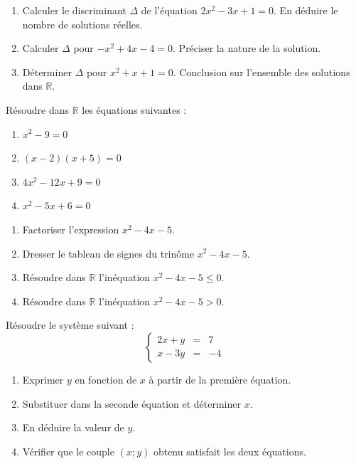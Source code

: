 \documentclass[11pt]{article}
\begin{document}
\begin{exercice}
\begin{enumerate}
    \item Calculer le discriminant $\Delta$ de l'équation $2x^2 - 3x + 1 = 0$. En déduire le nombre de solutions réelles.
    \item Calculer $\Delta$ pour $-x^2 + 4x - 4 = 0$. Préciser la nature de la solution.
    \item Déterminer $\Delta$ pour $x^2 + x + 1 = 0$. Conclusion sur l'ensemble des solutions dans $\mathbb{R}$.
\end{enumerate}
\end{exercice}

\begin{exercice}
Résoudre dans $\mathbb{R}$ les équations suivantes :
\begin{enumerate}
    \item $x^2 - 9 = 0$
    \item $(x-2)(x+5) = 0$
    \item $4x^2 - 12x + 9 = 0$
    \item $x^2 - 5x + 6 = 0$
\end{enumerate}
\end{exercice}

\begin{exercice}
\begin{enumerate}
    \item Factoriser l'expression $x^2 - 4x - 5$.
    \item Dresser le tableau de signes du trinôme $x^2 - 4x - 5$.
    \item Résoudre dans $\mathbb{R}$ l'inéquation $x^2 - 4x - 5 \leq 0$.
    \item Résoudre dans $\mathbb{R}$ l'inéquation $x^2 - 4x - 5 > 0$.
\end{enumerate}
\end{exercice}

\begin{exercice}
Résoudre le système suivant :
\[
\left\{
\begin{array}{rcl}
2x + y &=& 7 \\
x - 3y &=& -4
\end{array}
\right.
\]
\begin{enumerate}
    \item Exprimer $y$ en fonction de $x$ à partir de la première équation.
    \item Substituer dans la seconde équation et déterminer $x$.
    \item En déduire la valeur de $y$.
    \item Vérifier que le couple $(x;y)$ obtenu satisfait les deux équations.
\end{enumerate}
\end{exercice}
\end{document}
